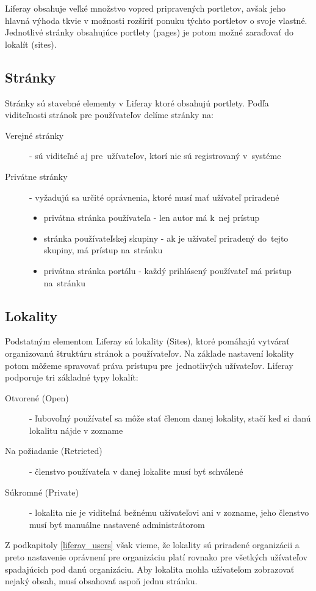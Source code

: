 \documentclass[
  digital, %
  twoside, %
  notable,   %
  nolof,   %
  nolot,   %
]{fithesis3}
\begin{document}
Liferay obsahuje veľké množstvo vopred pripravených portletov, avšak jeho hlavná výhoda tkvie v možnosti rozšíriť ponuku týchto portletov o svoje vlastné. Jednotlivé stránky obsahujúce portlety (pages) je potom možné zaraďovať do lokalít (sites).

\subsection{Stránky}
Stránky sú stavebné elementy v Liferay ktoré obsahujú portlety. Podľa viditeľnosti stránok pre používateľov delíme stránky na:
\begin{description}
\item[Verejné stránky] - sú viditeľné aj pre~užívateľov, ktorí nie sú registrovaný v~systéme
\item[Privátne stránky] - vyžadujú sa určité oprávnenia, ktoré musí mať užívateľ priradené
\begin{itemize}
\item privátna stránka používateľa - len autor má k~nej prístup
\item stránka používateľskej skupiny - ak je užívateľ priradený do~tejto skupiny, má prístup na~stránku
\item privátna stránka portálu - každý prihlásený používateľ má prístup na~stránku
\end{itemize}
\end{description}

\subsection{Lokality}
Podstatným elementom Liferay sú lokality (Sites), ktoré pomáhajú vytvárať organizovanú štruktúru stránok a používateľov. Na základe nastavení lokality potom môžeme spravovať práva prístupu pre~jednotlivých užívateľov. Liferay podporuje tri základné typy lokalít\cite{burska2016portlety}:
\begin{description}
\item[Otvorené (Open)] - ľubovoľný používateľ sa môže stať členom danej lokality, stačí keď si danú lokalitu nájde v zozname
\item[Na požiadanie (Retricted)] - členstvo používateľa v danej lokalite musí byť schválené
\item[Súkromné (Private)] - lokalita nie je viditeľná bežnému užívateľovi ani v zozname, jeho členstvo musí byť manuálne nastavené administrátorom
\end{description}
Z podkapitoly \ref{liferay_users} však vieme, že lokality sú priradené organizácii a preto nastavenie oprávnení pre organizáciu platí rovnako pre všetkých užívateľov spadajúcich pod danú organizáciu. Aby lokalita mohla užívateľom zobrazovať nejaký obsah, musí obsahovať aspoň jednu stránku.
\end{document}

